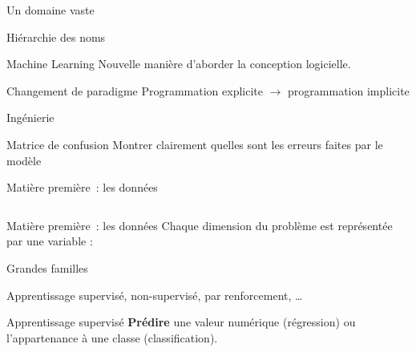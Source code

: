 \begin{frame}{Un domaine vaste}
\end{frame}

\begin{frame}{Hiérarchie des noms}
\end{frame}

\begin{frame}{Machine Learning}
  Nouvelle manière d'aborder la conception logicielle.
  \vfill
  \begin{block}{Changement de paradigme}
  Programmation explicite $\rightarrow$ programmation implicite
  \end{block}
\end{frame}

\begin{frame}{Ingénierie}
\end{frame}

\begin{frame}{Matrice de confusion}
  Montrer clairement quelles sont les erreurs faites par le modèle
\end{frame}

\begin{frame}{Matière première~: les données}
  \begin{columns}
    \begin{column}{.48\textwidth}
    \end{column}
    \begin{column}{.52\textwidth}
    \end{column}
  \end{columns}
\end{frame}

\begin{frame}{Matière première~: les données}
  Chaque dimension du problème est représentée par une variable : 
\end{frame}

\begin{frame}{Grandes familles}

  Apprentissage supervisé, non-supervisé, par renforcement, …
\end{frame}

\begin{frame}{Apprentissage supervisé}
  \textbf{Prédire} une valeur numérique (régression) ou l'appartenance à une classe (classification).
\end{frame}

